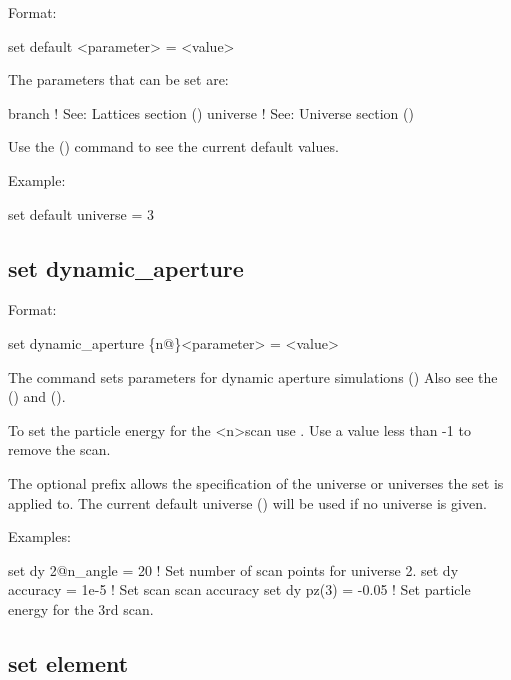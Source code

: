 {{{Format:
\begin{example}
  set default <parameter> = <value>
\end{example}

The parameters that can be set are:
\begin{example}
  branch            ! See: Lattices section ()
  universe          ! See: Universe section ()
\end{example}

Use the  () command to see the current
default values.

Example:
\begin{example}
  set default universe = 3
\end{example}


\subsection{set dynamic_aperture}
\label{s:set.da}

Format:
\begin{example}
  set dynamic_aperture \{n@\}<parameter> = <value>
\end{example}

The  command sets parameters for dynamic aperture simulations
() Also see the  () and
 ().

To set the particle energy for the <n>\Th scan use . Use a value less than -1 to remove
the scan.

The optional  prefix allows the specification of the universe or universes the set is applied
to. The current default universe () will be used if no universe is given.

Examples:
\begin{example}
  set dy 2@n_angle = 20   ! Set number of scan points for universe 2.
  set dy accuracy = 1e-5  ! Set scan scan accuracy
  set dy pz(3) = -0.05    ! Set particle energy for the 3rd scan.
\end{example}


\subsection{set element}
\label{s:set.element}

}}}
